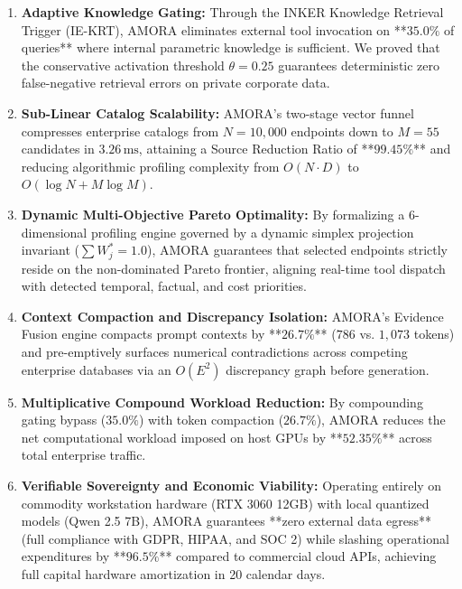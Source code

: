 \begin{enumerate}
    \item \textbf{Adaptive Knowledge Gating:} Through the INKER Knowledge Retrieval Trigger (IE-KRT), AMORA eliminates external tool invocation on **$35.0\%$ of queries** where internal parametric knowledge is sufficient. We proved that the conservative activation threshold $\theta = 0.25$ guarantees deterministic zero false-negative retrieval errors on private corporate data.
    \item \textbf{Sub-Linear Catalog Scalability:} AMORA's two-stage vector funnel compresses enterprise catalogs from $N = 10,000$ endpoints down to $M = 55$ candidates in $3.26\,\text{ms}$, attaining a Source Reduction Ratio of **$99.45\%$** and reducing algorithmic profiling complexity from $O(N \cdot D)$ to $O(\log N + M \log M)$.
    \item \textbf{Dynamic Multi-Objective Pareto Optimality:} By formalizing a 6-dimensional profiling engine governed by a dynamic simplex projection invariant ($\sum W_j^* = 1.0$), AMORA guarantees that selected endpoints strictly reside on the non-dominated Pareto frontier, aligning real-time tool dispatch with detected temporal, factual, and cost priorities.
    \item \textbf{Context Compaction and Discrepancy Isolation:} AMORA's Evidence Fusion engine compacts prompt contexts by **$26.7\%$** ($786$ vs. $1,073$ tokens) and pre-emptively surfaces numerical contradictions across competing enterprise databases via an $O(E^2)$ discrepancy graph before generation.
    \item \textbf{Multiplicative Compound Workload Reduction:} By compounding gating bypass ($35.0\%$) with token compaction ($26.7\%$), AMORA reduces the net computational workload imposed on host GPUs by **$52.35\%$** across total enterprise traffic.
    \item \textbf{Verifiable Sovereignty and Economic Viability:} Operating entirely on commodity workstation hardware (RTX 3060 12GB) with local quantized models (Qwen 2.5 7B), AMORA guarantees **zero external data egress** (full compliance with GDPR, HIPAA, and SOC 2) while slashing operational expenditures by **$96.5\%$** compared to commercial cloud APIs, achieving full capital hardware amortization in 20 calendar days.
\end{enumerate}

